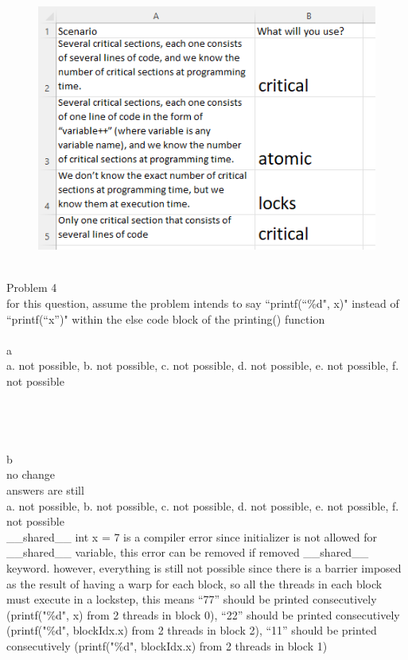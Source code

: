 \documentclass[12pt,border=4pt,multi]{article} %
\begin{document}
\begin{figure}[h!]
	\centering
	\includegraphics[width=\textwidth, height=0.9\textwidth]{3c} %
\end{figure}\\
\newpage
\noindent 
Problem 4\\
for this question, assume the problem intends to say “printf(“\%d", x)" instead of “printf(“x”)" within the else code block of the printing() function\\ 
\\
a\\
a. not possible, b. not possible, c. not possible, d. not possible, e. not possible, f. not possible\\
\\
\\
\\
\\
b\\
no change\\ 
answers are still\\
a. not possible, b. not possible, c. not possible, d. not possible, e. not possible, f. not possible\\
\_\_shared\_\_ int x = 7 is a compiler error since initializer is not allowed for \_\_shared\_\_ variable, this error can be removed if removed \_\_shared\_\_ keyword. however, everything is still not possible since there is a barrier imposed as the result of having a warp for each block, so all the threads in each block must execute in a lockstep, this means “77” should be printed consecutively (printf("\%d", x) from 2 threads in block 0), “22” should be printed consecutively (printf("\%d", blockIdx.x) from 2 threads in block 2), “11” should be printed consecutively (printf("\%d", blockIdx.x) from 2 threads in block 1)\\
\end{document}

